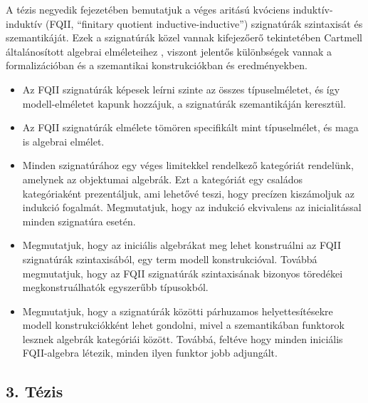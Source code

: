 \documentclass[12pt]{article}
\begin{document}
A tézis negyedik fejezetében bemutatjuk a véges aritású kvóciens
induktív-induktív (FQII, ``finitary quotient inductive-inductive'') szignatúrák
szintaxisát és szemantikáját. Ezek a szignatúrák közel vannak kifejezőerő
tekintetében Cartmell általánosított algebrai elméleteihez \cite{gat}, viszont
jelentős különbségek vannak a formalizációban és a szemantikai konstrukciókban
és eredményekben.
\begin{itemize}
\item Az FQII szignatúrák képesek leírni szinte az összes típuselméletet,
      és így modell-elméletet kapunk hozzájuk, a szignatúrák szemantikáján
      keresztül.
\item Az FQII szignatúrák elmélete tömören specifikált mint típuselmélet, és
      maga is algebrai elmélet.
\item
      Minden szignatúrához egy véges limitekkel rendelkező kategóriát rendelünk,
      amelynek az objektumai algebrák. Ezt a kategóriát egy családos
      kategóriaként \cite{cwfs} prezentáljuk, ami lehetővé teszi, hogy precízen
      kiszámoljuk az indukció fogalmát. Megmutatjuk, hogy az indukció ekvivalens
      az inicialitással minden szignatúra esetén.
\item
     Megmutatjuk, hogy az iniciális algebrákat meg lehet konstruálni az FQII
     szignatúrák szintaxisából, egy term modell konstrukcióval. Továbbá
     megmutatjuk, hogy az FQII szignatúrák szintaxisának bizonyos töredékei
     megkonstruálhatók egyszerűbb típusokból.
\item
     Megmutatjuk, hogy a szignatúrák közötti párhuzamos helyettesítésekre modell
     konstrukciókként lehet gondolni, mivel a szemantikában funktorok lesznek
     algebrák kategóriái között.  Továbbá, feltéve hogy minden iniciális
     FQII-algebra létezik, minden ilyen funktor jobb adjungált.
\end{itemize}

\subsection*{3. Tézis}
\end{document}
